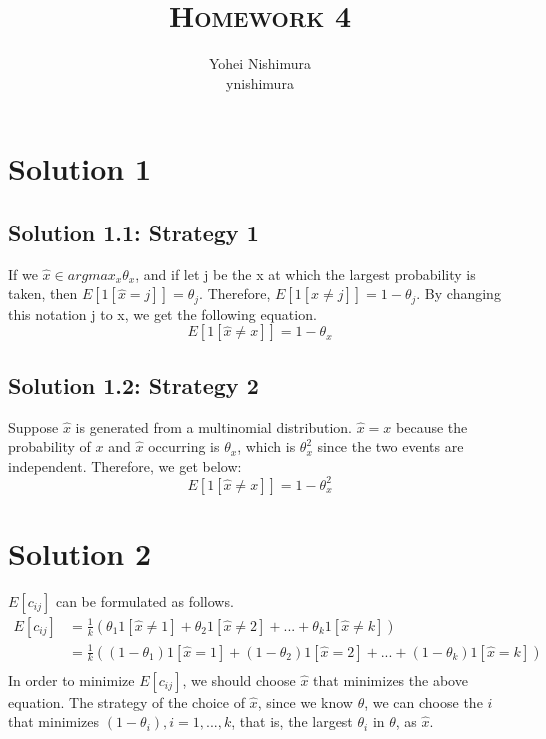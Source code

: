 \documentclass[a4paper]{article}
\title{\textsc{Homework 4}} %
\author{
	Yohei Nishimura \\
	ynishimura \\
}
\date{}
\theoremstyle{definition}
\newenvironment{soln}{
	\leavevmode\color{blue}\ignorespaces
}{}
\begin{document}
	
	\maketitle 
		
	\section*{Solution 1}
      		\subsection*{Solution 1.1: Strategy 1}
     		 \begin{soln}
		 If we $\hat{x} \in argmax_x \theta_x$, and if let j be the x at which the largest probability is taken,  then $E[1[\hat{x} = j]] = \theta_j$. Therefore, $E[1[\hat{x} \neq j]] = 1 - \theta_j$. By changing this notation j to x, we get the following equation.
 		     \[
 		     E[1[\hat{x} \neq x]] = 1 - \theta_x
 		     \]
		  \end{soln}
      
   		   \subsection*{Solution 1.2: Strategy 2}
		   \begin{soln}
  		    Suppose $\hat{x}$ is generated from a multinomial distribution. $\hat{x} = x$ because the probability of $x$ and $\hat{x}$ occurring is $\theta_x$, which is $\theta^2_x$ since the two events are independent. Therefore, we get below:
  		    \[
 		     E[1[\hat{x} \neq x]] = 1 - \theta^2_x
  		    \]
		 \end{soln}
      
      	\section*{Solution 2}
	\begin{soln}
		$E[c_{ij}]$ can be formulated as follows.
		\begin{equation*}
		\begin{split}
		E[c_{ij}] &= \frac{1}{k} (\theta_1 1[\hat{x} \neq 1] + \theta_2 1[\hat{x} \neq 2] + ... + \theta_k 1[\hat{x} \neq k] )\\
		&= \frac{1}{k} ( (1 - \theta_1) 1[\hat{x} = 1] + (1 - \theta_2) 1[\hat{x} = 2] + ... + (1 - \theta_k) 1[\hat{x} = k]  ) \\
			\end{split}
		\end{equation*}	
		In order to minimize $E[c_{ij}]$, we should choose $\hat{x}$ that minimizes the above equation. The strategy of the choice of $\hat{x}$, since we know $\theta$, we can choose the $i$ that minimizes $(1-\theta_i), i = 1, ..., k$, that is, the largest $\theta_i$ in $\theta$, as $\hat{x}$.
	
	\end{soln}
	
\end{document}
